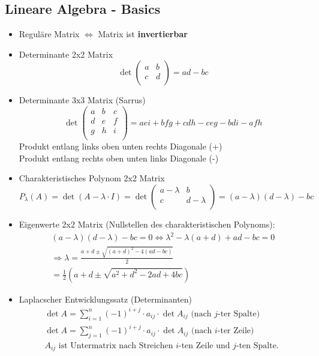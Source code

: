 \documentclass[a4paper]{article}
\begin{document}
\subsection{Lineare Algebra - Basics}
\begin{itemize}
	\item Reguläre Matrix $\Leftrightarrow$ Matrix ist \textbf{invertierbar} 
	\item Determinante 2x2 Matrix
		\[
		\det \begin{pmatrix} 
			a & b \\
			c & d \\
		\end{pmatrix} 
		= ad - bc
		\] 
	\item Determinante 3x3 Matrix (Sarrus)
		\[
		\det \begin{pmatrix} 
			a & b & c \\
			d & e & f \\
			g & h & i \\
		\end{pmatrix} =
		aei + bfg + cdh
		- ceg - bdi - afh
		\] 
		Produkt entlang links oben unten rechts Diagonale (+) \\
		Produkt entlang rechts oben unten links Diagonale (-)
	\item Charakteristisches Polynom 2x2 Matrix
		\[
			P_\lambda (A)
			= \det (A - \lambda \cdot I) =
			\det \begin{pmatrix} 
				a - \lambda & b \\
				c & d - \lambda \\
			\end{pmatrix} =
			(a - \lambda) (d - \lambda) - bc
		\] 
	\item Eigenwerte 2x2 Matrix
		(Nullstellen des charakteristischen Polynoms):
		\begin{gather*}
			(a - \lambda) (d - \lambda) - bc = 0
			\Leftrightarrow 
			\lambda ^2 - \lambda (a + d) + ad - bc = 0 \\
			\Rightarrow
			\lambda = \frac{ a+d \pm \sqrt{(a+d) ^2 -4 (ad -bc)} }{ 2 } \\
			= \frac{ 1 }{ 2 } \left(
				a + d \pm \sqrt{
					a ^2 + d ^2 - 2 ad + 4 bc
				} 
			\right) 
		\end{gather*}
	\item Laplacscher Entwicklungssatz (Determinanten)
		\begin{gather*}
			\det A = \sum_{i=1}^{n} (-1) ^{i+j} \cdot a_{ij} \cdot \det A_{ij}
			\text{ (nach $j$-ter Spalte) }
			\\
			\det A = \sum_{j=1}^{n} (-1) ^{i+j} \cdot a_{ij} \cdot \det A_{ij}
			\text{ (nach $i$-ter Zeile) }
			\\
			A_{ij} \text{ ist Untermatrix nach Streichen $i$-ten Zeile}
			\text{ und $j$-ten Spalte. }
		\end{gather*}
\end{itemize}
\end{document}
